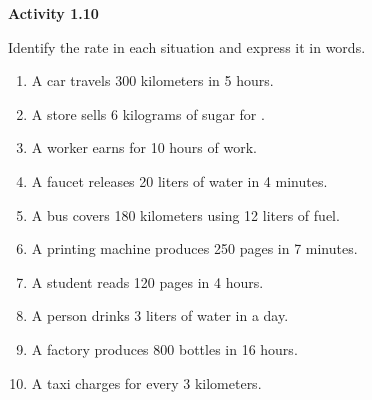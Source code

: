 \vspace{0.3ex}
\noindent\textbf{Activity 1.10}

\vspace{0.2ex}

Identify the rate in each situation and express it in words.
\begin{enumerate}
    \item A car travels 300 kilometers in 5 hours.
    \item A store sells 6 kilograms of sugar for .
    \item A worker earns  for 10 hours of work.
    \item A faucet releases 20 liters of water in 4 minutes.
    \item A bus covers 180 kilometers using 12 liters of fuel.
    \item A printing machine produces 250 pages in 7 minutes.
    \item A student reads 120 pages in 4 hours.
    \item A person drinks 3 liters of water in a day.
    \item A factory produces 800 bottles in 16 hours.
    \item A taxi charges  for every 3 kilometers.
\end{enumerate}
